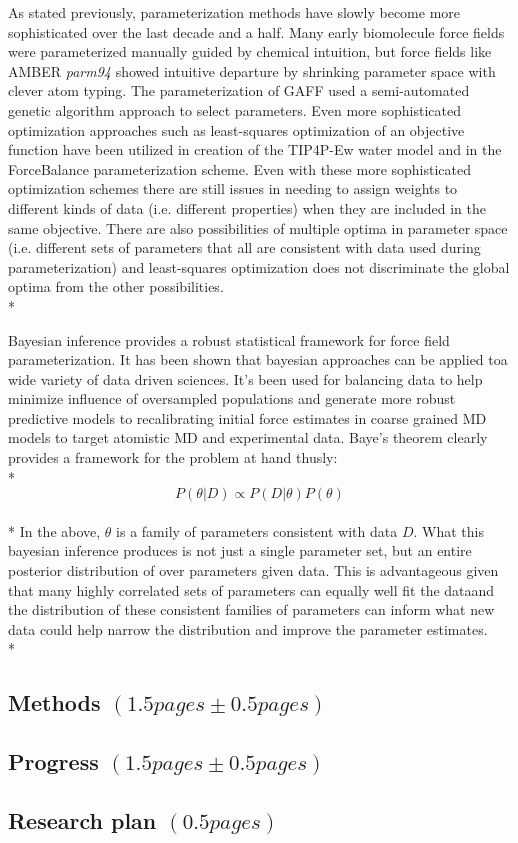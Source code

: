 \documentclass[rmp,nofootinbib,superscriptaddress,12pt,tightenlines,notitlepage]{revtex4-1}
\begin{document}
As stated previously, parameterization methods have slowly become more sophisticated over the last decade and a half. Many early biomolecule force fields were parameterized manually guided by chemical intuition, but force fields like AMBER \textit{parm94} showed intuitive departure by shrinking parameter space with clever atom typing.\cite{parm94} The parameterization of GAFF used a semi-automated genetic algorithm approach to select parameters.\cite{amber} Even more sophisticated optimization approaches such as least-squares optimization of an objective function have been utilized in creation of the TIP4P-Ew water model\cite{tip4pew} and in the ForceBalance parameterization scheme\cite{FB1,FB2,FB3}. Even with these more sophisticated optimization schemes there are still issues in needing to assign weights to different kinds of data (i.e. different properties) when they are included in the same objective. There are also possibilities of multiple optima in parameter space (i.e. different sets of parameters that all are consistent with data used during parameterization) and least-squares optimization does not discriminate the global optima from the other possibilities.\\*

Bayesian inference provides a robust statistical framework for force field parameterization. It has been shown that bayesian approaches can be applied toa wide variety of data driven sciences. It's been used for balancing data to help minimize influence of oversampled populations and generate more robust predictive models\cite{bayes_imbalance} to recalibrating initial force estimates in coarse grained MD models to target atomistic MD and experimental data\cite{bayes_coarse}. Baye's theorem clearly provides a framework for the problem at hand thusly:\\*
\begin{equation} P\left(\theta|D\right) \propto P\left(D|\theta\right) P\left(\theta\right)\end{equation}\\*
In the above, $\theta$ is a family of parameters consistent with data $D$. What this bayesian inference produces is not just a single parameter set, but an entire posterior distribution of over parameters given data. This is advantageous given that many highly correlated sets of parameters can equally well fit the dataand the distribution of these consistent families of parameters can inform what new data could help narrow the distribution and improve the parameter estimates.\\*

\subsection{Methods $\left(1.5 pages \pm 0.5 pages\right)$}

\subsection{Progress $\left(1.5 pages \pm 0.5 pages\right)$}

\subsection{Research plan $\left(0.5 pages\right)$}



\end{document}
